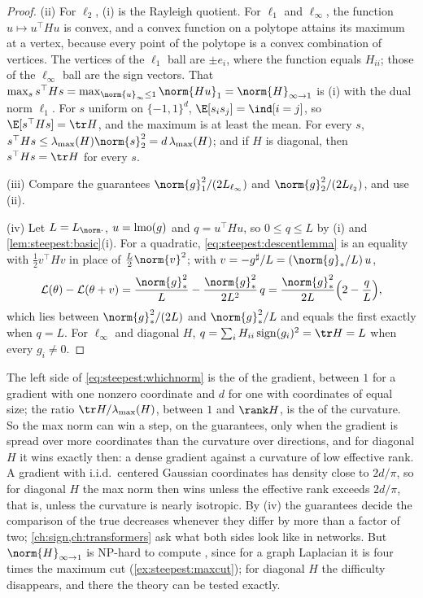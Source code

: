 \begin{refsection}
\begin{proof}
(ii) For $\ell_2$, (i) is the Rayleigh quotient. For $\ell_1$ and $\ell_\infty$, the function $u\mapsto u^\top Hu$ is convex, and a convex function on a polytope attains its maximum at a vertex, because every point of the polytope is a convex combination of vertices. The vertices of the $\ell_1$ ball are $\pm e_i$, where the function equals $H_{ii}$; those of the $\ell_\infty$ ball are the sign vectors. That $\max_ss^\top Hs=\max_{\norm{u}_\infty\le1}\norm{Hu}_1=\norm{H}_{\infty\to1}$ is (i) with the dual norm $\ell_1$. For $s$ uniform on $\{-1,1\}^d$, $\E[s_is_j]=\ind[i=j]$, so $\E[s^\top Hs]=\tr H$, and the maximum is at least the mean. For every $s$, $s^\top Hs\le\lmax(H)\norm{s}_2^2=d\,\lmax(H)$; and if $H$ is diagonal, then $s^\top Hs=\tr H$ for every $s$.

(iii) Compare the guarantees $\norm{g}_1^2/(2L_{\ell_\infty})$ and $\norm{g}_2^2/(2L_{\ell_2})$, and use (ii).

(iv) Let $L=L_{\norm\cdot}$, $u=\operatorname{lmo}(g)$ and $q=u^\top Hu$, so $0\le q\le L$ by (i) and \cref{lem:steepest:basic}(i). For a quadratic, \eqref{eq:steepest:descentlemma} is an equality with $\frac12v^\top Hv$ in place of $\frac L2\norm{v}^2$; with $v=-g^\sharp/L=(\norm{g}_*/L)\,u$,
\[
  \Loss(\theta)-\Loss(\theta+v)=\frac{\norm{g}_*^2}{L}-\frac{\norm{g}_*^2}{2L^2}\,q=\frac{\norm{g}_*^2}{2L}\Bigl(2-\frac qL\Bigr),
\]
which lies between $\norm{g}_*^2/(2L)$ and $\norm{g}_*^2/L$ and equals the first exactly when $q=L$. For $\ell_\infty$ and diagonal $H$, $q=\sum_iH_{ii}\sign(g_i)^2=\tr H=L$ when every $g_i\ne0$.
\end{proof}

The left side of \eqref{eq:steepest:whichnorm} is the  of the gradient, between $1$ for a gradient with one nonzero coordinate and $d$ for one with coordinates of equal size; the ratio $\tr H/\lmax(H)$, between $1$ and $\rank H$, is the  of the curvature. So the max norm can win a step, on the guarantees, only when the gradient is spread over more coordinates than the curvature over directions, and for diagonal $H$ it wins exactly then: a dense gradient against a curvature of low effective rank. A gradient with i.i.d.\ centered Gaussian coordinates has density close to $2d/\pi$, so for diagonal $H$ the max norm then wins unless the effective rank exceeds $2d/\pi$, that is, unless the curvature is nearly isotropic. By (iv) the guarantees decide the comparison of the true decreases whenever they differ by more than a factor of two; \cref{ch:sign,ch:transformers} ask what both sides look like in networks. But $\norm{H}_{\infty\to1}$ is NP-hard to compute \parencite{Rohn2000}, since for a graph Laplacian it is four times the maximum cut (\cref{ex:steepest:maxcut}); for diagonal $H$ the difficulty disappears, and there the theory can be tested exactly.


\end{refsection}
